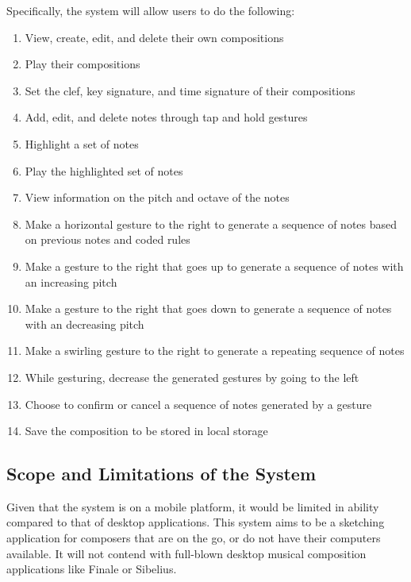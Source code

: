     	Specifically, the system will allow users to do the following: 
          \begin{enumerate}
              \item View, create, edit, and delete their own compositions
              \item Play their compositions
              \item Set the clef, key signature, and time signature of their compositions
              \item Add, edit, and delete notes through tap and hold gestures
              \item Highlight a set of notes
              \item Play the highlighted set of notes
              \item View information on the pitch and octave of the notes
              \item Make a horizontal gesture to the right to generate a sequence of notes based on previous notes and coded rules
              \item Make a gesture to the right that goes up to generate a sequence of notes with an increasing pitch
              \item Make a gesture to the right that goes down to generate a sequence of notes with an decreasing pitch
              \item Make a swirling gesture to the right to generate a repeating sequence of notes
              \item While gesturing, decrease the generated gestures by going to the left
              \item Choose to confirm or cancel a sequence of notes generated by a gesture
              \item Save the composition to be stored in local storage    

          \end{enumerate}
    
\subsection{Scope and Limitations of the System}

Given that the system is on a mobile platform, it would be limited in ability compared to that of desktop applications. This system aims to be a sketching application for composers that are on the go, or do not have their computers available. It will not contend with full-blown desktop musical composition applications like Finale or Sibelius.

